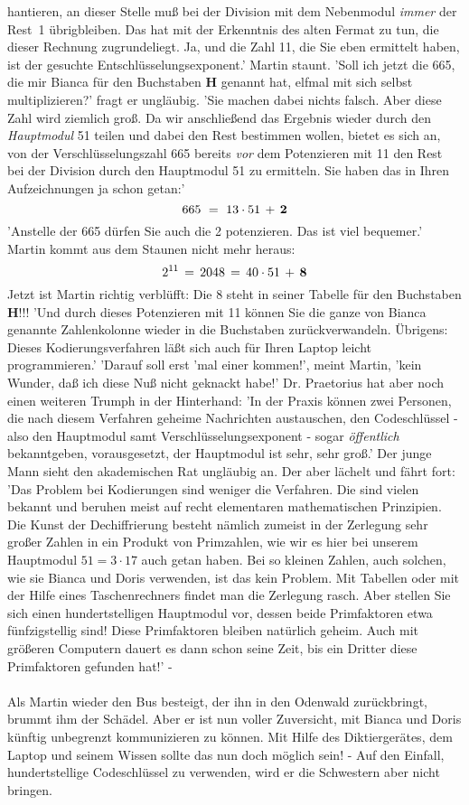 hantieren, an dieser Stelle mu{\ss} bei der Division mit dem Nebenmodul
{\em immer\/} der Rest~1 \"ubrigbleiben. Das hat mit der Erkenntnis des alten
Fermat zu tun, die dieser Rechnung zugrundeliegt. Ja, und die Zahl 11, die Sie
eben ermittelt haben, ist der gesuchte Entschl\"usselungsexponent.' Martin
staunt. 'Soll ich jetzt die 665, die mir Bianca f\"ur den Buchstaben {\bf H}
genannt hat, elfmal mit sich selbst multiplizieren?' fragt er ungl\"aubig.
'Sie machen dabei nichts falsch. Aber diese Zahl wird ziemlich gro{\ss}. Da
wir anschlie{\ss}end das Ergebnis wieder durch den {\em Hauptmodul\/} 51
teilen und dabei den Rest bestimmen wollen, bietet es sich an, von der
Verschl\"usselungszahl 665 bereits {\em vor\/} dem Potenzieren mit 11 den
Rest bei der Division durch den Hauptmodul 51 zu ermitteln. Sie haben das in
Ihren Aufzeichnungen ja schon getan:'
\[665\,\,=\,\,13\cdot 51\,+\,{\bf 2} \]
'Anstelle der 665 d\"urfen Sie auch die 2 potenzieren. Das ist viel bequemer.'
Martin kommt aus dem Staunen nicht mehr heraus:
\[2^{11}\,=\,2048\,=\,40\cdot 51\,+\,{\bf 8} \]
Jetzt ist Martin richtig verbl\"ufft: Die 8 steht in seiner Tabelle f\"ur den
Buchstaben {\bf H}!!! 'Und durch dieses Potenzieren mit 11 k\"onnen Sie die
ganze von Bianca genannte Zahlenkolonne wieder in die Buchstaben
zur\"uckverwandeln. \"Ubrigens: Dieses Kodierungsverfahren l\"a{\ss}t sich
auch f\"ur Ihren Laptop leicht programmieren.' 'Darauf soll erst 'mal einer
kommen!', meint Martin, 'kein Wunder, da{\ss} ich diese Nu{\ss} nicht geknackt
habe!' Dr. Praetorius hat aber noch einen weiteren Trumph in der Hinterhand:
'In der Praxis k\"onnen zwei Personen, die nach diesem Verfahren geheime
Nachrichten austauschen, den Codeschl\"ussel - also den Hauptmodul samt
Verschl\"usselungsexponent - sogar {\em \"offentlich\/} bekanntgeben,
vorausgesetzt, der Hauptmodul ist sehr, sehr gro{\ss}.' Der junge Mann sieht
den akademischen Rat ungl\"aubig an. Der aber l\"achelt und f\"ahrt fort: 'Das
Problem bei Kodierungen sind weniger die Verfahren. Die sind vielen bekannt
und beruhen meist auf recht elementaren mathematischen Prinzipien. Die Kunst
der Dechiffrierung besteht n\"amlich zumeist in der Zerlegung sehr gro{\ss}er
Zahlen in ein Produkt von Primzahlen, wie wir es hier bei unserem Hauptmodul
\(51=3\cdot 17 \) auch getan haben. Bei so kleinen Zahlen, auch solchen, wie
sie Bianca und Doris verwenden, ist das kein Problem. Mit Tabellen oder mit der
Hilfe eines Taschenrechners findet man die Zerlegung rasch. Aber stellen Sie
sich einen hundertstelligen Hauptmodul vor, dessen beide Primfaktoren etwa
f\"unfzigstellig sind! Diese Primfaktoren bleiben nat\"urlich geheim. Auch mit
gr\"o{\ss}eren Computern dauert es dann schon seine Zeit, bis ein Dritter diese
Primfaktoren gefunden hat!' -  \\ \\
Als Martin wieder den Bus besteigt, der ihn in den Odenwald zur\"uckbringt,
brummt ihm der Sch\"adel. Aber er ist nun voller Zuversicht, mit Bianca und
Doris k\"unftig unbegrenzt kommunizieren zu k\"onnen. Mit Hilfe des
Diktierger\"ates, dem Laptop und seinem Wissen sollte das nun doch m\"oglich
sein! - Auf den Einfall, hundertstellige Codeschl\"ussel zu verwenden, wird
er die Schwestern aber nicht bringen. 